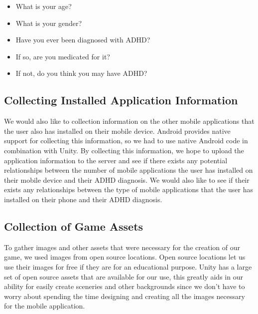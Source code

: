 \documentclass[a4wide]{article}
\begin{document}
\begin{itemize}
  \item What is your age?
  \item What is your gender?
  \item Have you ever been diagnosed with ADHD?
  \item If so, are you medicated for it?
  \item If not, do you think you may have ADHD?
\end{itemize}

\subsection{Collecting Installed Application Information}
\- We would also like to collection information on the other mobile applications that the user also has installed on their mobile device. Android provides native support for collecting this information, so we had to use native Android code in combination with Unity. By collecting this information, we hope to upload the application information to the server and see if there exists any potential relationships between the number of mobile applications the user has installed on their mobile device and their ADHD diagnosis. We would also like to see if their exists any relationships between the type of mobile applications that the user has installed on their phone and their ADHD diagnosis.

\subsection{Collection of Game Assets}
\- To gather images and other assets that were necessary for the creation of our game, we used images from open source locations. Open source locations let us use their images for free if they are for an educational purpose.  Unity has a large set of open source assets that are available for our use, this greatly aids in our ability for easily create sceneries and other backgrounds since we don't have to worry about spending the time designing and creating all the images necessary for the mobile application.
\end{document}
